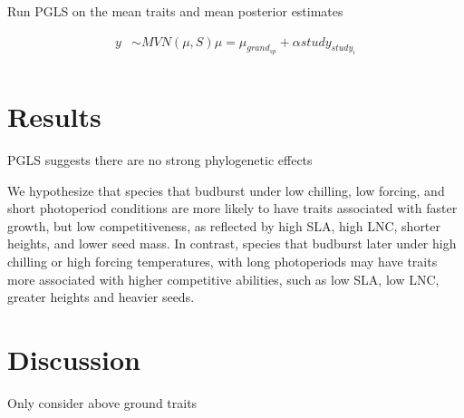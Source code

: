\documentclass{article}\usepackage[]{graphicx}\usepackage[]{color}
\begin{document}
Run PGLS on the mean traits and mean posterior estimates 

\begin{align*}
y & \sim MVN(\mu, S)
\mu = \mu_{grand_{sp}} + \alpha study_{study_i} \\
\end{align*}

\section{Results}
PGLS suggests there are no strong phylogenetic effects

 We hypothesize that species that budburst under low chilling, low forcing, and short photoperiod conditions are more likely to have traits associated with faster growth, but low competitiveness, as reflected by high SLA, high LNC, shorter heights, and lower seed mass. In contrast, species that budburst later under high chilling or high forcing temperatures, with long photoperiods  may have traits more associated with higher competitive abilities, such as low SLA, low LNC, greater heights and heavier seeds. 
 
\section{Discussion}

Only consider above ground traits

\pagebreak
% 

\end{document}
